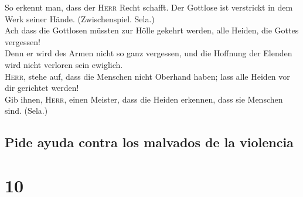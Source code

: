  So erkennt man, dass der \textsc{Herr} Recht schafft.
Der Gottlose ist verstrickt in dem Werk seiner Hände. (Zwischenspiel.
Sela.)\\
 Ach dass die Gottlosen müssten zur Hölle gekehrt werden,
alle Heiden, die Gottes vergessen!\\
 Denn er wird des Armen nicht so ganz vergessen, und die
Hoffnung der Elenden wird nicht verloren sein ewiglich.\\
 \textsc{Herr}, stehe auf, dass die Menschen nicht
Oberhand haben; lass alle Heiden vor dir gerichtet werden!\\
 Gib ihnen, \textsc{Herr}, einen Meister, dass die Heiden
erkennen, dass sie Menschen sind. (Sela.)

\hypertarget{pide-ayuda-contra-los-malvados-de-la-violencia}{%
\subsection{Pide ayuda contra los malvados de la
violencia}\label{pide-ayuda-contra-los-malvados-de-la-violencia}}

\hypertarget{section-9}{%
\section{10}\label{section-9}}

